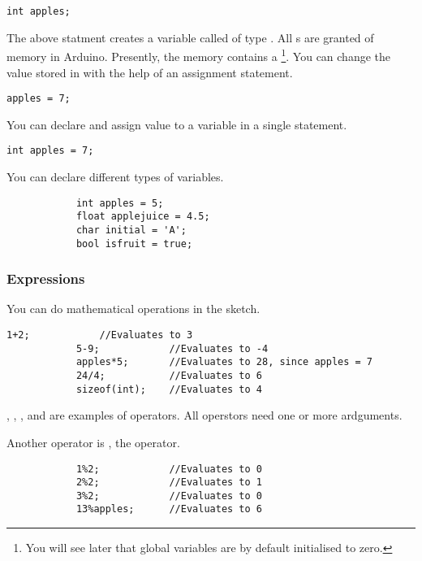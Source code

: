 \documentclass{article}
\begin{document}
			\begin{lstlisting}[caption={Declaration}, label=declaration]
			int apples;
			\end{lstlisting}

			The above statment creates a variable called  of type . All s are granted  of memory in Arduino. Presently, the memory contains a \footnote{You will see later that global variables are by default initialised to zero.}. You can change the value stored in  with the help of an assignment statement.

			\begin{lstlisting}[caption={Assignment}, label=assignment]
			apples = 7;
			\end{lstlisting}

			You can declare and assign value to a variable in a single statement.

			\begin{lstlisting}[caption={Assignment}, label=assignment]
			int apples = 7;
			\end{lstlisting}

			You can declare different types of variables.

			\begin{lstlisting}
			int apples = 5;
			float applejuice = 4.5;
			char initial = 'A';
			bool isfruit = true;
			\end{lstlisting}

		\subsubsection{Expressions}

			You can do mathematical operations in the sketch.

			\begin{lstlisting}[caption={Expressions}, label=expressions]
			1+2;			//Evaluates to 3
			5-9;			//Evaluates to -4
			apples*5;		//Evaluates to 28, since apples = 7
			24/4;			//Evaluates to 6
			sizeof(int);	//Evaluates to 4
			\end{lstlisting}

			\inlncd{+}, \inlncd{-}, \inlncd{*}, \inlncd{/} and  are examples of operators. All operstors need one or more ardguments.

			Another operator is \inlncd{\%}, the  operator.

			\begin{lstlisting}
			1%2;			//Evaluates to 0
			2%2;			//Evaluates to 1
			3%2;			//Evaluates to 0
			13%apples;		//Evaluates to 6
			\end{lstlisting}
\end{document}
